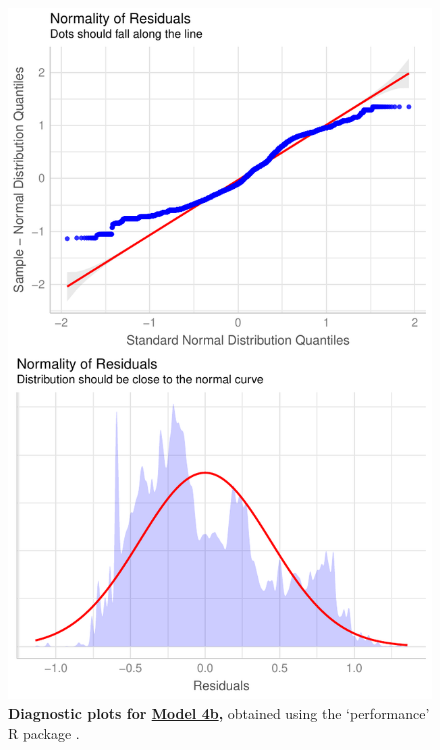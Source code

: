 \begin{figure}[h!]
\centering
\includegraphics[scale=0.7]{Supporting/Chapter3/Figures/Diagnostics/Diag_model4b}
\caption[Diagnostic plots for Model 4b]{\textbf{Diagnostic plots for \underline{Model 4b},} obtained using the `performance' R package \citep{performance}.}
\label{}
\end{figure}

